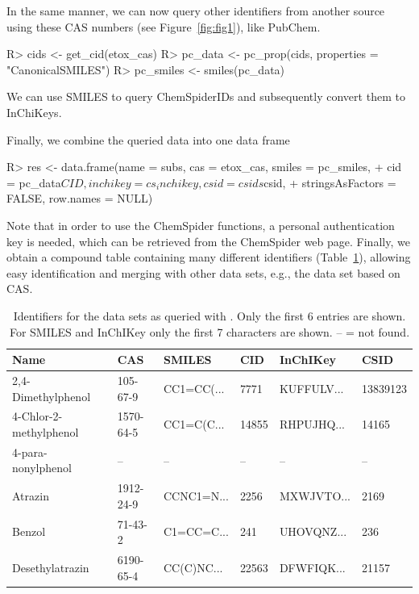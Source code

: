\documentclass[article]{jss}
\begin{document}
In the same manner, we can now query other identifiers from another
source using these CAS numbers (see Figure~\ref{fig:fig1}), like
PubChem.
%
\begin{CodeChunk}
\begin{CodeInput}
R> cids <- get_cid(etox_cas)
R> pc_data <- pc_prop(cids, properties = "CanonicalSMILES")
R> pc_smiles <- smiles(pc_data)
\end{CodeInput}
\end{CodeChunk}
%
We can use SMILES to query ChemSpiderIDs and subsequently convert them to InChiKeys.
%
\begin{CodeChunk}
\end{CodeChunk}
%
Finally, we combine the queried data into one data frame
%
\begin{CodeChunk}
\begin{CodeInput}
R> res <- data.frame(name = subs, cas = etox_cas, smiles = pc_smiles, 
+    cid = pc_data$CID, inchikey = cs_inchikey, csid = csids$csid, 
+    stringsAsFactors = FALSE, row.names = NULL)
\end{CodeInput}
\end{CodeChunk}
%
Note that in order to use the ChemSpider functions, a personal
authentication key is needed, which can be retrieved
from the ChemSpider web page.  Finally, we obtain a compound table
containing many different identifiers (Table~\ref{tab:comptable}),
allowing easy identification and merging with other data sets, e.g.,
the  data set based on CAS.

\begin{table}[t!]
\centering
\begin{tabular}{llllll}
  \hline
Name & CAS & SMILES & CID & InChIKey & CSID \\ 
  \hline
2,4-Dimethylphenol & 105-67-9 & CC1=CC(... & 7771 & KUFFULV... & 13839123 \\ 
  4-Chlor-2-methylphenol & 1570-64-5 & CC1=C(C... & 14855 & RHPUJHQ... & 14165 \\ 
  4-para-nonylphenol & -- & -- & -- & -- & -- \\ 
  Atrazin & 1912-24-9 & CCNC1=N... & 2256 & MXWJVTO... & 2169 \\ 
  Benzol & 71-43-2 & C1=CC=C... & 241 & UHOVQNZ... & 236 \\ 
  Desethylatrazin & 6190-65-4 & CC(C)NC... & 22563 & DFWFIQK... & 21157 \\ 
   \hline
\end{tabular}
\caption{Identifiers for the  data sets as queried with
  . Only the first 6 entries are shown. For SMILES and
  InChIKey only the first 7 characters are shown. -- = not found.}
\label{tab:comptable}
\end{table}
\end{document}
